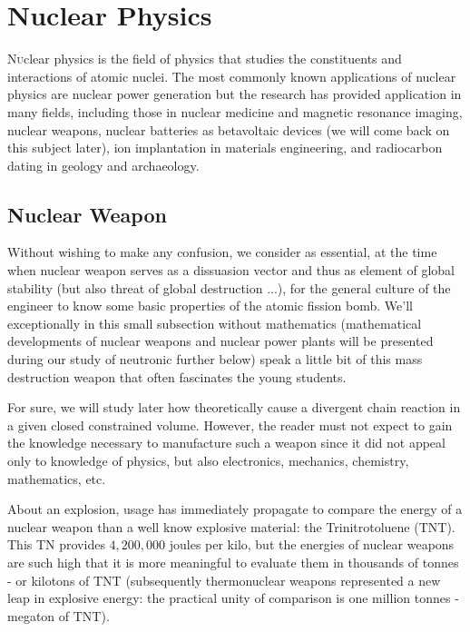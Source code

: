 	\newpage
	\thispagestyle{empty}
	\mbox{}
	\section{Nuclear Physics}\label{nuclear physics}
	\lettrine[lines=4]{\color{BrickRed}N}uclear physics is the field of physics that studies the constituents and interactions of atomic nuclei. The most commonly known applications of nuclear physics are nuclear power generation but the research has provided application in many fields, including those in nuclear medicine and magnetic resonance imaging, nuclear weapons, nuclear batteries as betavoltaic devices (we will come back on this subject later), ion implantation in materials engineering, and radiocarbon dating in geology and archaeology.
	
	\subsection{Nuclear Weapon}
	Without wishing to make any confusion, we consider as essential, at the time when nuclear weapon serves as a dissuasion vector and thus as element of global stability (but also threat of global destruction ...), for the general culture of the engineer to know some basic properties of the atomic fission bomb. We'll exceptionally in this small subsection without mathematics (mathematical developments of nuclear weapons and nuclear power plants will be presented during our study of neutronic further below) speak a little bit of this mass destruction weapon that often fascinates the young students.
	
	For sure, we will study later how theoretically cause a divergent chain reaction in a given closed constrained volume. However, the reader must not expect to gain the knowledge necessary to manufacture such a weapon since it did not appeal only to knowledge of physics, but also electronics, mechanics, chemistry, mathematics, etc.
	
	About an explosion, usage has immediately propagate to compare the energy of a nuclear weapon than a well know explosive material: the Trinitrotoluene (TNT). This TN provides $4,200,000$ joules per kilo, but the energies of nuclear weapons are such high that it is more meaningful to evaluate them in thousands of tonnes - or kilotons of TNT (subsequently thermonuclear weapons represented a new leap in explosive energy: the practical unity of comparison is one million tonnes - megaton of TNT).
	
